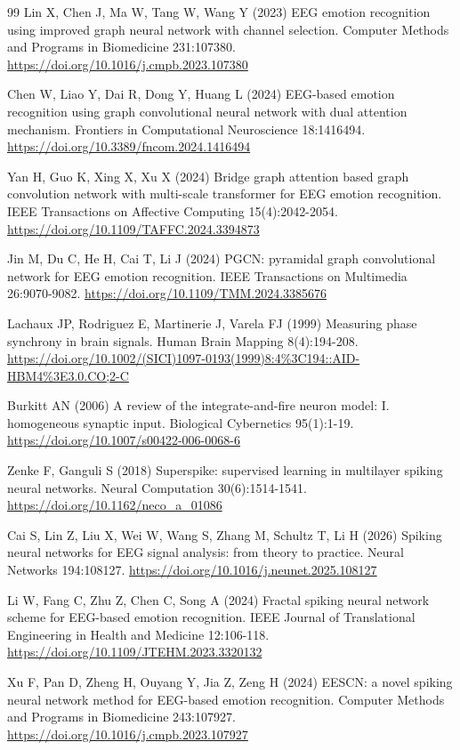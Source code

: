 \documentclass[pdflatex,sn-basic,Numbered]{sn-jnl}
\begin{document}
\begin{thebibliography}{99}
\small
{} Lin X, Chen J, Ma W, Tang W, Wang Y (2023) EEG emotion recognition using improved graph neural network with channel selection. Computer Methods and Programs in Biomedicine 231:107380. \url{https://doi.org/10.1016/j.cmpb.2023.107380}

 Chen W, Liao Y, Dai R, Dong Y, Huang L (2024) EEG-based emotion recognition using graph convolutional neural network with dual attention mechanism. Frontiers in Computational Neuroscience 18:1416494. \url{https://doi.org/10.3389/fncom.2024.1416494}

 Yan H, Guo K, Xing X, Xu X (2024) Bridge graph attention based graph convolution network with multi-scale transformer for EEG emotion recognition. IEEE Transactions on Affective Computing 15(4):2042-2054. \url{https://doi.org/10.1109/TAFFC.2024.3394873}

 Jin M, Du C, He H, Cai T, Li J (2024) PGCN: pyramidal graph convolutional network for EEG emotion recognition. IEEE Transactions on Multimedia 26:9070-9082. \url{https://doi.org/10.1109/TMM.2024.3385676}

 Lachaux JP, Rodriguez E, Martinerie J, Varela FJ (1999) Measuring phase synchrony in brain signals. Human Brain Mapping 8(4):194-208. \url{https://doi.org/10.1002/(SICI)1097-0193(1999)8:4%3C194::AID-HBM4%3E3.0.CO;2-C}

 Burkitt AN (2006) A review of the integrate-and-fire neuron model: I. homogeneous synaptic input. Biological Cybernetics 95(1):1-19. \url{https://doi.org/10.1007/s00422-006-0068-6}

 Zenke F, Ganguli S (2018) Superspike: supervised learning in multilayer spiking neural networks. Neural Computation 30(6):1514-1541. \url{https://doi.org/10.1162/neco_a_01086}

 Cai S, Lin Z, Liu X, Wei W, Wang S, Zhang M, Schultz T, Li H (2026) Spiking neural networks for EEG signal analysis: from theory to practice. Neural Networks 194:108127. \url{https://doi.org/10.1016/j.neunet.2025.108127}

 Li W, Fang C, Zhu Z, Chen C, Song A (2024) Fractal spiking neural network scheme for EEG-based emotion recognition. IEEE Journal of Translational Engineering in Health and Medicine 12:106-118. \url{https://doi.org/10.1109/JTEHM.2023.3320132}

 Xu F, Pan D, Zheng H, Ouyang Y, Jia Z, Zeng H (2024) EESCN: a novel spiking neural network method for EEG-based emotion recognition. Computer Methods and Programs in Biomedicine 243:107927. \url{https://doi.org/10.1016/j.cmpb.2023.107927}


\end{thebibliography}
\end{document}
